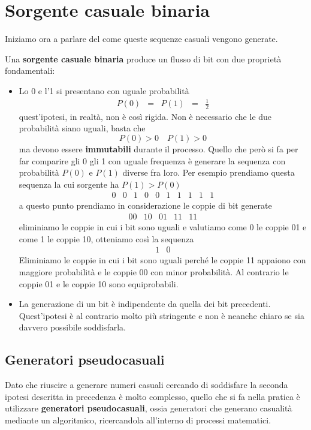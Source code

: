 \section{Sorgente casuale binaria}
Iniziamo ora a parlare del come queste sequenze casuali vengono generate.

\begin{definition}
	Una \textbf{sorgente casuale binaria} produce un flusso di bit con due propriet\`a fondamentali:
	\begin{itemize}
		\item Lo 0 e l'1 si presentano con uguale probabilit\`a
		      \[ \begin{matrix} P(0) & = & P(1) & = & \displaystyle\frac{1}{2} \end{matrix} \]
		      quest'ipotesi, in realt\`a, non \`e cos\`i rigida. Non \`e necessario che le due probabilit\`a siano
		      uguali, basta che
		      \[ P(0) > 0 \quad P(1) > 0 \]
		      ma devono essere \textbf{immutabili} durante il processo. Quello che per\`o si fa per far comparire gli 0
		      gli 1 con uguale frequenza \`e generare la sequenza con probabilit\`a $P(0)$ e $P(1)$ diverse fra loro.
		      Per esempio prendiamo questa sequenza la cui sorgente ha $P(1) > P(0)$
		      \[ \begin{matrix} 0 & 0 & 1 & 0 & 0 & 1 & 1 & 1 & 1 & 1 \end{matrix} \]
		      a questo punto prendiamo in considerazione le coppie di bit generate
		      \[ \begin{matrix} 00 & 10 & 01 & 11 & 11 \end{matrix} \]
		      eliminiamo le coppie in cui i bit sono uguali e valutiamo come 0 le coppie 01 e come 1 le coppie 10,
		      otteniamo cos\`i la sequenza
		      \[ \begin{matrix} 1 & 0 \end{matrix} \]
		      Eliminiamo le coppie in cui i bit sono uguali perch\'e le coppie 11 appaiono con maggiore probabilit\`a
		      e le coppie 00 con minor probabilit\`a. Al contrario le coppie 01 e le coppie 10 sono equiprobabili.
		\item La generazione di un bit \`e indipendente da quella dei bit precedenti. Quest'ipotesi \`e al contrario
		      molto pi\`u stringente e non \`e neanche chiaro se sia davvero possibile soddisfarla.
	\end{itemize}
\end{definition}

\subsection{Generatori pseudocasuali}
Dato che riuscire a generare numeri casuali cercando di soddisfare la seconda ipotesi descritta in precedenza \`e molto
complesso, quello che si fa nella pratica \`e utilizzare \textbf{generatori pseudocasuali}, ossia generatori che generano
casualit\`a mediante un algoritmico, ricercandola all'interno di processi matematici.

